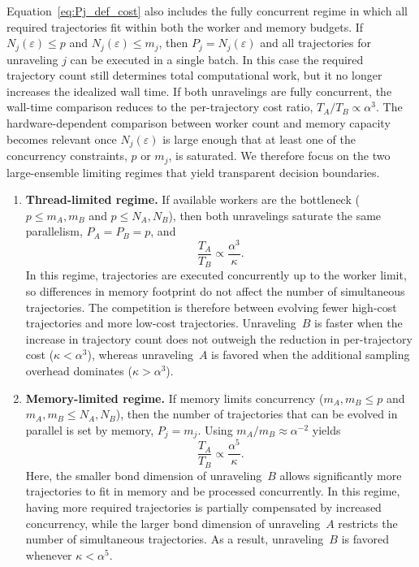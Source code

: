 \documentclass[aps, pra, superscriptaddress, reprint, floatfix]{revtex4-2}
\theoremstyle{plain}
\begin{document}
Equation~\eqref{eq:Pj_def_cost} also includes the fully concurrent regime in which all required trajectories fit within both the worker and memory budgets. If $N_j(\varepsilon)\le p$ and $N_j(\varepsilon)\le m_j$, then $P_j=N_j(\varepsilon)$ and all trajectories for unraveling $j$ can be executed in a single batch. In this case the required trajectory count still determines total computational work, but it no longer increases the idealized wall time. If both unravelings are fully concurrent, the wall-time comparison reduces to the per-trajectory cost ratio, $T_A/T_B\propto\alpha^3$. The hardware-dependent comparison between worker count and memory capacity becomes relevant once $N_j(\varepsilon)$ is large enough that at least one of the concurrency constraints, $p$ or $m_j$, is saturated. We therefore focus on the two large-ensemble limiting regimes that yield transparent decision boundaries.

\begin{enumerate}
\item \textbf{Thread-limited regime.}
If available workers are the bottleneck ($p \le m_A,m_B$ and $p \le N_A,N_B$), then both unravelings saturate the same parallelism, $P_A=P_B=p$, and
\begin{equation}
\frac{T_A}{T_B} \propto \frac{\alpha^3}{\kappa}.
\end{equation}
In this regime, trajectories are executed concurrently up to the worker limit, so differences in memory footprint do not affect the number of simultaneous trajectories. The competition is therefore between evolving fewer high-cost trajectories and more low-cost trajectories. Unraveling~$B$ is faster when the increase in trajectory count does not outweigh the reduction in per-trajectory cost ($\kappa < \alpha^3$), whereas unraveling~$A$ is favored when the additional sampling overhead dominates ($\kappa > \alpha^3$).

\item \textbf{Memory-limited regime.}
If memory limits concurrency ($m_A,m_B \le p$ and $m_A,m_B \le N_A,N_B$), then the number of trajectories that can be evolved in parallel is set by memory, $P_j=m_j$. Using $m_A/m_B \approx \alpha^{-2}$ yields
\begin{equation}
\frac{T_A}{T_B} \propto \frac{\alpha^5}{\kappa}.
\end{equation}
Here, the smaller bond dimension of unraveling~$B$ allows significantly more trajectories to fit in memory and be processed concurrently. In this regime, having more required trajectories is partially compensated by increased concurrency, while the larger bond dimension of unraveling~$A$ restricts the number of simultaneous trajectories. As a result, unraveling~$B$ is favored whenever $\kappa < \alpha^5$.
\end{enumerate}
\end{document}
